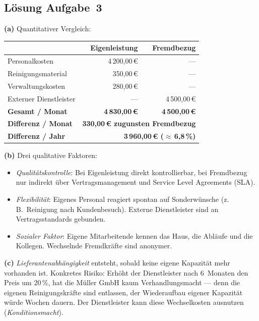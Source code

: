 \documentclass[11pt, a4paper]{article}
\begin{document}
\subsection*{Lösung Aufgabe~3}
\begin{loesung}
\textbf{(a)} Quantitativer Vergleich:

\begin{center}
\begin{tabular}{p{5cm} r r}
\toprule
 & Eigenleistung & Fremdbezug\\
\midrule
Personalkosten & 4\,200,00\,€ & --- \\
Reinigungsmaterial & 350,00\,€ & --- \\
Verwaltungskosten & 280,00\,€ & --- \\
Externer Dienstleister & --- & 4\,500,00\,€ \\
\midrule
\textbf{Gesamt / Monat} & \textbf{4\,830,00\,€} & \textbf{4\,500,00\,€}\\
\midrule
\textbf{Differenz / Monat} & \multicolumn{2}{r}{\textbf{330,00\,€ zugunsten Fremdbezug}}\\
\textbf{Differenz / Jahr} & \multicolumn{2}{r}{\textbf{3\,960,00\,€ ($\approx$\,6{,}8\,\%)}}\\
\bottomrule
\end{tabular}
\end{center}

\textbf{(b)} Drei qualitative Faktoren:
\begin{itemize}[itemsep=0pt]
  \item \emph{Qualitätskontrolle}: Bei Eigenleistung direkt kontrollierbar, bei Fremdbezug nur indirekt über Vertragsmanagement und Service Level Agreements (SLA).
  \item \emph{Flexibilität}: Eigenes Personal reagiert spontan auf Sonderwünsche (z.\,B.\ Reinigung nach Kunden\-besuch). Externe Dienstleister sind an Vertragsstandards gebunden.
  \item \emph{Sozialer Faktor}: Eigene Mitarbeitende kennen das Haus, die Abläufe und die Kollegen. Wechselnde Fremdkräfte sind anonymer.
\end{itemize}

\textbf{(c)} \emph{Lieferantenabhängigkeit} entsteht, sobald keine eigene Kapazität mehr vorhanden ist. Konkretes Risiko: Erhöht der Dienstleister nach 6~Monaten den Preis um 20\,\%, hat die Müller GmbH kaum Verhandlungsmacht --- denn die eigenen Reinigungskräfte sind entlassen, der Wieder\-aufbau eigener Kapazität würde Wochen dauern. Der Dienstleister kann diese Wechselkosten ausnutzen (\emph{Konditionsmacht}).


\end{loesung}
\end{document}
